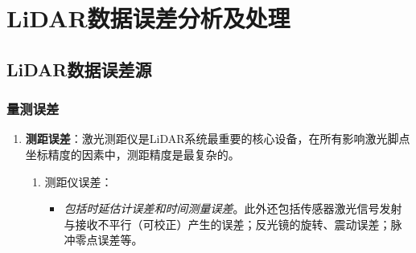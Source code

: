 
\chapter{LiDAR数据误差分析及处理}

\section{LiDAR数据误差源}

\subsection{量测误差}

\begin{enumerate}
	\item \textbf{测距误差}：激光测距仪是LiDAR系统最重要的核心设备，在所有影响激光脚点坐标精度的因素中，测距精度是最复杂的。
	\begin{enumerate}
		\item {\cukai 测距仪误差}：
		\begin{itemize}
			\item \textit{包括时延估计误差和时间测量误差}。此外还包括传感器激光信号发射与接收不平行（可校正）产生的误差；反光镜的旋转、震动误差；脉冲零点误差等。
			

\end{itemize}
\end{enumerate}
\end{enumerate}
